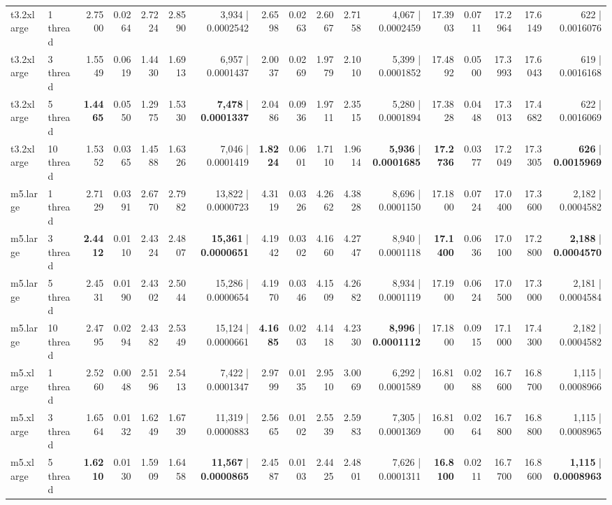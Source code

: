\documentclass[conference]{IEEEtran}
\begin{document}
\begin{table}[h]
{\begin{tabular}{ll|rrrrr|rrrrr|rrrrr}
			\midrule
			t3.2xlarge & 1 thread & 2.7500 & 0.0264 & 2.7224 & 2.8590 & 3,934 | 0.0002542 & 2.6598 & 0.0263 & 2.6067 & 2.7158 & 4,067 | 0.0002459 & 17.3903 & 0.0711 & 17.2964 & 17.6149 & 622 | 0.0016076 \\
			t3.2xlarge & 3 thread & 1.5549 & 0.0619 & 1.4430 & 1.6913 & 6,957 | 0.0001437 & 2.0037 & 0.0269 & 1.9779 & 2.1010 & 5,399 | 0.0001852 & 17.4892 & 0.0500 & 17.3993 & 17.6043 & 619 | 0.0016168 \\
			t3.2xlarge & 5 thread & \textbf{1.4465} & 0.0550 & 1.2975 & 1.5330 & \textbf{7,478} | \textbf{0.0001337} & 2.0486 & 0.0936 & 1.9711 & 2.3515 & 5,280 | 0.0001894 & 17.3828 & 0.0448 & 17.3013 & 17.4682 & 622 | 0.0016069 \\
			t3.2xlarge & 10 thread & 1.5352 & 0.0365 & 1.4588 & 1.6326 & 7,046 | 0.0001419 & \textbf{1.8224} & 0.0601 & 1.7110 & 1.9614 & \textbf{5,936} | \textbf{0.0001685} & \textbf{17.2736} & 0.0377 & 17.2049 & 17.3305 & \textbf{626} | \textbf{0.0015969} \\
			\midrule
			m5.large & 1 thread & 2.7129 & 0.0391 & 2.6770 & 2.7982 & 13,822 | 0.0000723 & 4.3119 & 0.0326 & 4.2662 & 4.3828 & 8,696 | 0.0001150 & 17.1800 & 0.0724 & 17.0400 & 17.3600 & 2,182 | 0.0004582 \\
			m5.large & 3 thread & \textbf{2.4412} & 0.0110 & 2.4324 & 2.4807 & \textbf{15,361} | \textbf{0.0000651} & 4.1942 & 0.0302 & 4.1660 & 4.2747 & 8,940 | 0.0001118 & \textbf{17.1400} & 0.0636 & 17.0100 & 17.2800 & \textbf{2,188} | \textbf{0.0004570} \\
			m5.large & 5 thread & 2.4531 & 0.0190 & 2.4302 & 2.5044 & 15,286 | 0.0000654 & 4.1970 & 0.0346 & 4.1509 & 4.2682 & 8,934 | 0.0001119 & 17.1900 & 0.0624 & 17.0500 & 17.3000 & 2,181 | 0.0004584 \\
			m5.large & 10 thread & 2.4795 & 0.0294 & 2.4382 & 2.5349 & 15,124 | 0.0000661 & \textbf{4.1685} & 0.0203 & 4.1418 & 4.2330 & \textbf{8,996} | \textbf{0.0001112} & 17.1800 & 0.0915 & 17.1000 & 17.4300 & 2,182 | 0.0004582 \\
			\midrule
			m5.xlarge & 1 thread & 2.5260 & 0.0048 & 2.5196 & 2.5413 & 7,422 | 0.0001347 & 2.9799 & 0.0135 & 2.9510 & 3.0069 & 6,292 | 0.0001589 & 16.8100 & 0.0288 & 16.7600 & 16.8700 & 1,115 | 0.0008966 \\
			m5.xlarge & 3 thread & 1.6564 & 0.0132 & 1.6249 & 1.6739 & 11,319 | 0.0000883 & 2.5665 & 0.0102 & 2.5539 & 2.5983 & 7,305 | 0.0001369 & 16.8100 & 0.0264 & 16.7800 & 16.8800 & 1,115 | 0.0008965 \\
			m5.xlarge & 5 thread & \textbf{1.6210} & 0.0130 & 1.5909 & 1.6458 & \textbf{11,567} | \textbf{0.0000865} & 2.4587 & 0.0103 & 2.4425 & 2.4801 & 7,626 | 0.0001311 & \textbf{16.8100} & 0.0211 & 16.7700 & 16.8600 & \textbf{1,115} | \textbf{0.0008963} \\

\end{tabular}}
\end{table}
\end{document}
